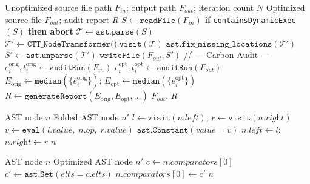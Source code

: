 \documentclass[conference]{IEEEtran}
\begin{document}
\begin{algorithm}[H]
\caption{CTT Main Optimization Pipeline}
\label{alg:main}
\begin{algorithmic}[1]
\REQUIRE Unoptimized source file path $F_{in}$; output path $F_{out}$;
         iteration count $N$
\ENSURE  Optimized source file $F_{out}$; audit report $R$
\STATE $S \leftarrow \texttt{readFile}(F_{in})$
\STATE \textbf{if} \texttt{containsDynamicExec}$(S)$ \textbf{then abort}
\STATE $\mathcal{T} \leftarrow \texttt{ast.parse}(S)$
\STATE $\mathcal{T}' \leftarrow \texttt{CTT\_NodeTransformer().visit}(\mathcal{T})$
\STATE $\texttt{ast.fix\_missing\_locations}(\mathcal{T}')$
\STATE $S' \leftarrow \texttt{ast.unparse}(\mathcal{T}')$
\STATE $\texttt{writeFile}(F_{out}, S')$
\STATE // --- Carbon Audit ---
  \STATE $e_i^{\text{orig}}, t_i^{\text{orig}} \leftarrow \texttt{auditRun}(F_{in})$
  \STATE $e_i^{\text{opt}}, t_i^{\text{opt}} \leftarrow \texttt{auditRun}(F_{out})$
\ENDFOR
\STATE $E_{\text{orig}} \leftarrow \texttt{median}(\{e_i^{\text{orig}}\})$;
       $E_{\text{opt}} \leftarrow \texttt{median}(\{e_i^{\text{opt}}\})$
\STATE $R \leftarrow \texttt{generateReport}(E_{\text{orig}}, E_{\text{opt}}, \ldots)$
\RETURN $F_{out}$, $R$
\end{algorithmic}
\end{algorithm}

\begin{algorithm}[H]
\caption{Constant Folding Sub-pass}
\label{alg:cf}
\begin{algorithmic}[1]
\REQUIRE AST node $n$
\ENSURE  Folded AST node $n'$
  \STATE $l \leftarrow \texttt{visit}(n.\textit{left})$;
         $r \leftarrow \texttt{visit}(n.\textit{right})$
    \STATE $v \leftarrow \texttt{eval}(l.\textit{value},\; n.\textit{op},\; r.\textit{value})$
    \RETURN $\texttt{ast.Constant}(value=v)$
  \ENDIF
  \STATE $n.\textit{left} \leftarrow l$; $n.\textit{right} \leftarrow r$
\ENDIF
\RETURN $n$
\end{algorithmic}
\end{algorithm}

\begin{algorithm}[H]
\caption{List-to-Set Membership Promotion Sub-pass}
\label{alg:ltset}
\begin{algorithmic}[1]
\REQUIRE AST node $n$
\ENSURE  Optimized AST node $n'$
    \STATE $c \leftarrow n.\textit{comparators}[0]$
        \STATE $c' \leftarrow \texttt{ast.Set}(\textit{elts}=c.\textit{elts})$
        \STATE $n.\textit{comparators}[0] \leftarrow c'$
      \ENDIF
    \ENDIF
  \ENDIF
\ENDIF
\RETURN $n$
\end{algorithmic}
\end{algorithm}
\end{document}

